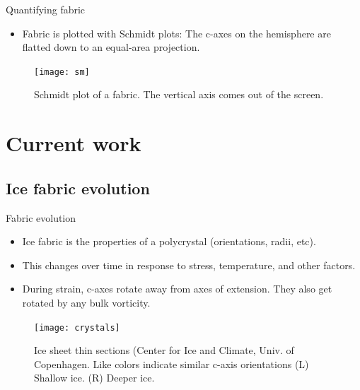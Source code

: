 \documentclass{beamer}
\begin{document}
\begin{frame}{Quantifying fabric}
      \begin{itemize}
      \item Fabric is plotted with Schmidt plots: The c-axes on the hemisphere are flatted down to an equal-area projection.
   \end{itemize}
 
   \begin{figure}
      \texttt{[image: sm]}
      \caption{Schmidt plot of a fabric. The vertical axis comes out of the screen.}
   \end{figure}
\end{frame}

\section{Current work}

\subsection{Ice fabric evolution}

\begin{frame}{Fabric evolution}
   \begin{itemize}
      \item Ice fabric is the properties of a polycrystal (orientations, radii, etc). 
      \item This changes over time in response to stress, temperature, and other factors.
      \item During strain, c-axes rotate away from axes of extension. They also get rotated by any bulk vorticity.
   \end{itemize}
   \begin{figure}
      \texttt{[image: crystals]}
   \caption{\tiny{Ice sheet thin sections (Center for Ice and Climate, Univ. of Copenhagen. Like colors indicate similar c-axis orientations (L) Shallow ice. (R) Deeper ice.}}
\end{figure}
\end{frame}
\end{document}

